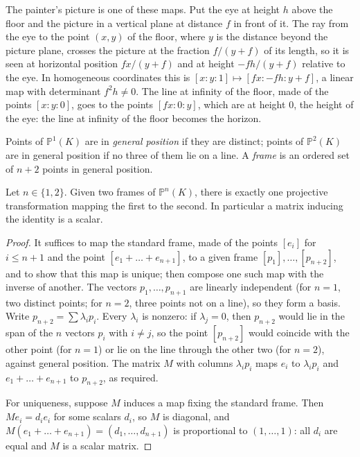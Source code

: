 The painter's picture is one of these maps. Put the eye at height $h$ above the floor and the picture in a vertical plane at distance $f$ in front
of it. The ray from the eye to the point $(x,y)$ of the floor, where $y$ is the distance beyond the picture plane, crosses the picture at the
fraction $f/(y+f)$ of its length, so it is seen at horizontal position $fx/(y+f)$ and at height $-fh/(y+f)$ relative to the eye. In homogeneous
coordinates this is $[x:y:1]\mapsto[fx:-fh:y+f]$, a linear map with determinant $f^2h\ne0$. The line at infinity of the floor, made of the points
$[x:y:0]$, goes to the points $[fx:0:y]$, which are at height $0$, the height of the eye: the line at infinity of the floor becomes the horizon.

\begin{definition}
Points of $\mathbb P^1(K)$ are in \emph{general position} if they are distinct; points of $\mathbb P^2(K)$ are in general position if no three
of them lie on a line.
A \emph{frame} is an ordered set of $n+2$ points in general position.
\end{definition}

\begin{proposition}[Frames]\label{prop:frames}
Let $n\in\{1,2\}$. Given two frames of $\mathbb P^n(K)$, there is exactly one projective transformation mapping the first to the second.
In particular a matrix inducing the identity is a scalar.
\end{proposition}

\begin{proof}
It suffices to map the standard frame, made of the points $[e_i]$ for $i\le n+1$ and the point $[e_1+\dots+e_{n+1}]$, to a given frame
$[p_1],\dots,[p_{n+2}]$, and to show that this map is unique; then compose one such map with the inverse of another. The vectors
$p_1,\dots,p_{n+1}$ are linearly independent (for $n=1$, two distinct points; for $n=2$, three points not on a line), so they form a basis. Write
$p_{n+2}=\sum\lambda_ip_i$. Every $\lambda_i$ is nonzero: if $\lambda_j=0$, then $p_{n+2}$ would lie in the span of the $n$ vectors $p_i$ with
$i\ne j$, so the point $[p_{n+2}]$ would coincide with the other point (for $n=1$) or lie on the line through the other two (for $n=2$), against
general position. The matrix $M$ with columns $\lambda_ip_i$ maps
$e_i$ to $\lambda_ip_i$ and $e_1+\dots+e_{n+1}$ to $p_{n+2}$, as required.

For uniqueness, suppose $M$ induces a map fixing the standard frame. Then $Me_i=d_ie_i$ for some scalars $d_i$, so $M$ is diagonal, and
$M(e_1+\dots+e_{n+1})=(d_1,\dots,d_{n+1})$ is proportional to $(1,\dots,1)$: all $d_i$ are equal and $M$ is a scalar matrix.
\end{proof}

